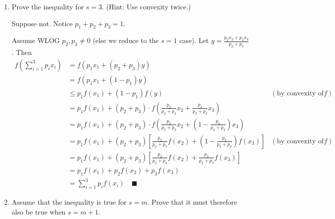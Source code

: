 \documentclass[12pt]{article}
\newcommand{\qed}{\quad \blacksquare}
\begin{document}
\begin{enumerate}[1.]
\begin{enumerate}
		            \color{black}

		      \item Prove the inequality for $s=3$. (Hint: Use convexity twice.)

		            \color{blue}
		            Suppose not. Notice $p_1 + p_2 + p_3 = 1$.

		            Assume WLOG $p_2, p_3 \neq 0$ (else we reduce to the $s = 1$ case). Let $y = \frac{p_2 x_2 + p_3 x_3}{p_2 + p_3}$. Then
		            \begin{align*}
			            f(\sum_{i=1}^3 p_i x_i) & = f(p_1 x_1 + (p_2 + p_3) y)                                                                                                            \\
			                                    & = f(p_1 x_1 + (1 - p_1) y)                                                                                                              \\
			                                    & \leq p_1 f(x_1) + (1 - p_1) f(y)                                                                          & (\text{by convexity of } f) \\
			                                    & = p_1 f(x_1) + (p_2 + p_3)\cdot f\left(\frac{p_2}{p_2 + p_3} x_2 + \frac{p_3}{p_2 + p_3} x_3\right)                                     \\
			                                    & = p_1 f(x_1) + (p_2 + p_3)\cdot f\left(\frac{p_2}{p_2 + p_3} x_2 + (1 - \frac{p_2}{p_2 + p_3}) x_3\right)                               \\
			                                    & = p_1 f(x_1) + (p_2 + p_3)\left[\frac{p_2}{p_2 + p_3} f(x_2) + (1 - \frac{p_2}{p_2 + p_3}) f(x_3)\right]  & (\text{by convexity of } f) \\
			                                    & = p_1 f(x_1) + (p_2 + p_3)\left[\frac{p_2}{p_2 + p_3} f(x_2) + \frac{p_3}{p_2 + p_3}f(x_3)\right]                                       \\
			                                    & = p_1 f(x_1) + p_2 f(x_2) + p_3 f(x_3)                                                                                                  \\
			                                    & = \sum_{i=1}^3 p_i f(x_i) \qed
		            \end{align*}
		            \color{black}


		      \item Assume that the inequality is true for $s=m$. Prove that it must therefore also be true when $s=m+1$.


\end{enumerate}
\end{enumerate}
\end{document}
